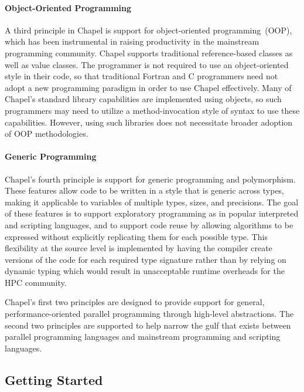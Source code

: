 \paragraph{Object-Oriented Programming}

A third principle in Chapel is support for object-oriented
programming~(OOP), which has been instrumental in raising productivity
in the mainstream programming community.  Chapel supports traditional
reference-based classes as well as value classes.  The programmer is
not required to use an object-oriented style in their code, so that
traditional Fortran and C programmers need not adopt a new programming
paradigm in order to use Chapel effectively.  Many of Chapel's
standard library capabilities are implemented using objects, so such
programmers may need to utilize a method-invocation style of syntax to
use these capabilities.  However, using such libraries does not
necessitate broader adoption of OOP methodologies.

\paragraph{Generic Programming}

Chapel's fourth principle is support for generic programming and
polymorphism.  These features allow code to be written in a style that
is generic across types, making it applicable to variables of multiple
types, sizes, and precisions.  The goal of these features is to
support exploratory programming as in popular interpreted and
scripting languages, and to support code reuse by allowing algorithms
to be expressed without explicitly replicating them for each possible
type.  This flexibility at the source level is implemented by having
the compiler create versions of the code for each required type
signature rather than by relying on dynamic typing which would result
in unacceptable runtime overheads for the HPC community.

Chapel's first two principles are designed to provide support for
general, performance-oriented parallel programming through high-level
abstractions.  The second two principles are supported to help narrow
the gulf that exists between parallel programming languages and
mainstream programming and scripting languages.


\subsection{Getting Started}

